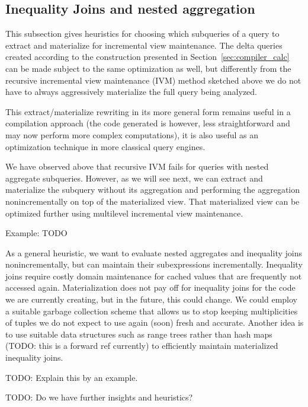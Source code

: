 \subsection{Inequality Joins and nested aggregation}
\label{sec:advanced-rewriting}

This subsection gives heuristics for choosing which subqueries of
a query to extract and materialize for incremental view maintenance.
The delta queries created according to the construction presented in
Section~\ref{sec:compiler_calc} can be made subject to the same optimization as well, but differently from the recursive
incremental view maintenance (IVM) method sketched above we do not have to always aggressively materialize the full query being analyzed.

This extract/materialize rewriting in its more general form remains useful in a compilation
approach (the code generated is however, less straightforward and may now
perform more complex computations), it is also useful as an optimization technique in more
classical query engines.

We have observed above that recursive IVM fails for queries with nested aggregate subqueries. However,
as we will see next, we can extract and materialize the subquery without its aggregation and performing the aggregation nonincrementally on top of the materialized view. That materialized view can be optimized further using multilevel incremental view maintenance.

Example: TODO


As a general heuristic, we want to evaluate nested aggregates and inequality joins nonincrementally, but can maintain their subexpressions incrementally. Inequality joins
require costly domain maintenance for cached values that are frequently not accessed again.
Materialization does not pay off for inequality joins for the code we are currently creating,
but in the future, this could change. We could employ a suitable garbage collection scheme that allows us to stop keeping multiplicities of tuples we do not expect to use again (soon) fresh and accurate. Another idea is to use
suitable data structures such as range trees rather than hash maps (TODO: this is a forward ref currently) to efficiently maintain materialized inequality joins.

TODO: Explain this by an example.

TODO: Do we have further insights and heuristics?

